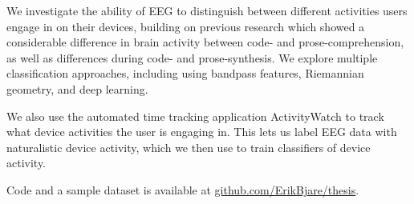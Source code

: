 We investigate the ability of EEG to distinguish between different activities users engage in on their devices, building on previous research which showed a considerable difference in brain activity between code- and prose-comprehension, as well as differences during code- and prose-synthesis. We explore multiple classification approaches, including using bandpass features, Riemannian geometry, and deep learning.

We also use the automated time tracking application ActivityWatch to track what device activities the user is engaging in. This lets us label EEG data with naturalistic device activity, which we then use to train classifiers of device activity.

Code and a sample dataset is available at \href{https://github.com/ErikBjare/thesis}{github.com/ErikBjare/thesis}.

